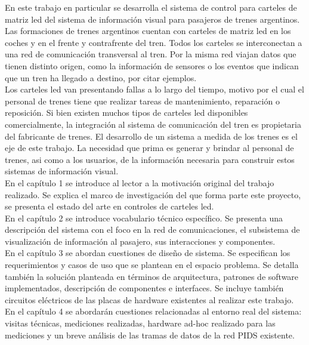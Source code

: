 En este trabajo en particular se desarrolla el sistema de control para carteles de matriz led del sistema de información visual para pasajeros de trenes argentinos. Las formaciones de trenes argentinos cuentan con carteles de matriz led en los coches y en el frente y contrafrente del tren. Todos los carteles se interconectan a una red de comunicación transversal al tren. Por la misma red viajan datos que tienen distinto origen, como la información de sensores o los eventos que indican que un tren ha llegado a destino, por citar ejemplos. \\

Los carteles led van presentando fallas a lo largo del tiempo, motivo por el cual el personal de trenes tiene que realizar tareas de mantenimiento, reparación o reposición. Si bien existen muchos tipos de carteles led disponibles comercialmente, la integración al sistema de comunicación del tren es propietaria del fabricante de trenes. El desarrollo de un sistema a medida de los trenes es el eje de este trabajo. La necesidad que prima es generar y brindar al personal de trenes, asi como a los usuarios, de la información necesaria para construir estos sistemas de información visual.\\


En el capítulo 1 se introduce al lector a la motivación original del trabajo realizado. Se explica el marco de investigación del que forma parte este proyecto, se presenta el estado del arte en controles de carteles led.\\

En el capítulo 2 se introduce vocabulario técnico específico. Se presenta una descripción del sistema con el foco en la red de comunicaciones, el subsistema de visualización de información al pasajero, sus interacciones y componentes.\\

En el capítulo 3 se abordan cuestiones de diseño de sistema. Se especifican los requerimientos y casos de uso que se plantean en el espacio problema. Se detalla también la solución planteada en términos de arquitectura, patrones de software implementados, descripción de componentes e interfaces. Se incluye también circuitos eléctricos de las placas de hardware existentes al realizar este trabajo.\\

En el capítulo 4 se abordarán cuestiones relacionadas al entorno real del sistema: visitas técnicas, mediciones realizadas, hardware ad-hoc realizado para las mediciones y un breve análisis de las tramas de datos de la red PIDS existente.\\

